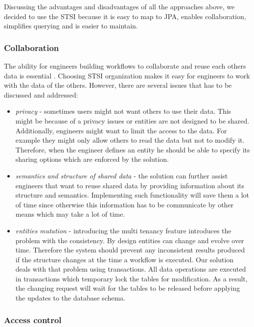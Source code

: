 Discussing the advantages and disadvantages of all the approaches above, we decided to use the STSI because it is easy to map to JPA, enables collaboration, simplifies querying and is easier to maintain.    

\subsubsection{Collaboration}
The ability for engineers building workflows to collaborate and reuse each others data is essential \cite{Lu}. Choosing STSI organization makes it easy for engineers to work with the data of the others. However, there are several issues that has to be discussed and addressed:

\begin{itemize}

	\item \textit{privacy} - sometimes users might not want others to use their data. This might be because of a privacy issues or entities are not designed to be shared. Additionally, engineers might want to limit the access to the data. For example they might only allow others to read the data but not to modify it. Therefore, when the engineer defines an entity he should be able to specify its sharing options which are enforced by the solution.
	 
	\item \textit{semantics and structure of shared data} - the solution can further assist engineers that want to reuse shared data by providing information about its structure and semantics. Implementing such functionality will save them a lot of time since otherwise this information has to be communicate by other means which may take a lot of time.
	
	\item \textit{entities mutation} - introducing the multi tenancy feature introduces the problem with the consistency. By design entities can change and evolve over time. Therefore the system should prevent any inconsistent results produced if the structure changes at the time a workflow is executed. Our solution deals with that problem using transactions. All data operations are executed in transactions which temporary lock the tables for modification. As a result, the changing request will wait for the tables to be released before applying the updates to the database schema.
\end{itemize}


\subsubsection{Access control}

